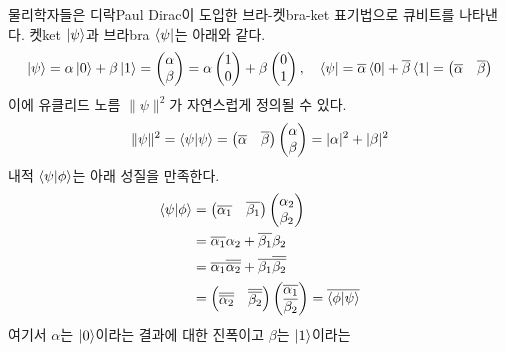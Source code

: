 \documentclass[a4paper,chapter,atbegshi]{oblivoir}
\begin{document}
물리학자들은 디락{\tiny Paul Dirac}이 도입한 브라-켓{\tiny bra-ket} 표기법으로
큐비트를 나타낸다. 켓{\tiny ket} $\ket{\psi}$과 브라{\tiny bra} $\bra{\psi}$는
아래와 같다.
 \[
   \ket{\psi} = \alpha\ket0+\beta\ket1 = \begin{pmatrix}\alpha\\\beta\end{pmatrix}
  =\alpha\begin{pmatrix}1\\0\end{pmatrix}+\beta\begin{pmatrix}0\\1\end{pmatrix},
  \quad
  \bra{\psi} = \overline{\alpha}\bra0 +\overline{\beta}\bra1=
   \begin{pmatrix}\overline{\alpha}&\overline{\beta}\end{pmatrix}
 \]
이에 유클리드 노름 $\|\psi\|^2$가 자연스럽게 정의될 수 있다. 
 \[
   \|\psi\|^2 = \braket{\psi|\psi} =
   \begin{pmatrix}\overline{\alpha}&\overline{\beta}\end{pmatrix}
   \begin{pmatrix}\alpha\\\beta\end{pmatrix}=|\alpha|^2+|\beta|^2
 \]
 내적 $\braket{\psi|\phi}$는 아래 성질을 만족한다.
 \begin{align*}
   \braket{\psi|\phi} &= 
   \begin{pmatrix}\overline{\alpha_1} &\overline{\beta_1}\end{pmatrix}
   \begin{pmatrix}\alpha_2\\\beta_2\end{pmatrix} \\
    &= \overline{\alpha_1}\alpha_2+\overline{\beta_1}\beta_2\\
    &=\overline{\alpha_1}\overline{\overline{\alpha_2}}+
    \overline{\beta_1}\overline{\overline{\beta_2}} \\
    &= \begin{pmatrix}\overline{\overline{\alpha_2}} & \overline{\overline{\beta_2}}\end{pmatrix}
   \begin{pmatrix}\overline{\alpha_1}\\\overline{\beta_2}\end{pmatrix}
   = \overline{\braket{\phi|\psi}}
 \end{align*}
 여기서 $\alpha$는 $\ket{0}$이라는 결과에 대한 진폭이고 $\beta$는 $\ket{1}$이라는
\end{document}
